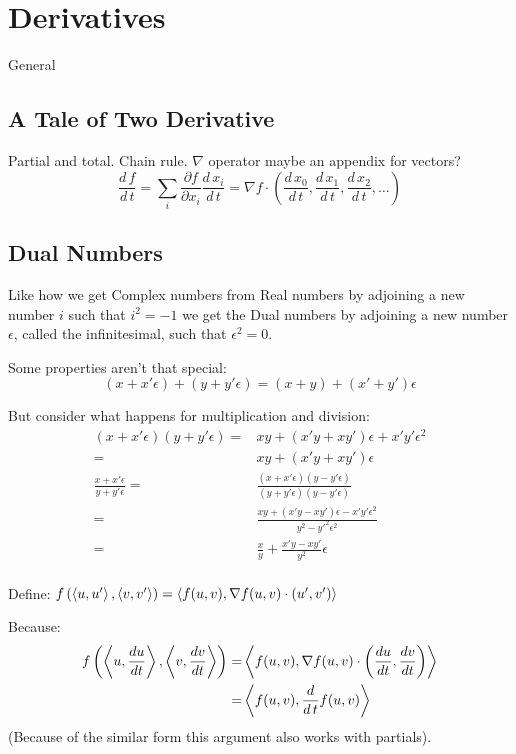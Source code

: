 
\chapter{Derivatives}
General
\section{A Tale of Two Derivative}
Partial and total.
Chain rule.
$\nabla$ operator maybe an appendix for vectors?
\[\frac{d\,f}{d\,t} = \sum_i \frac{\partial f}{\partial x_i}\frac{d\,x_i}{d\,t} = \nabla f \cdot \left(\frac{d\,x_0}{d\,t},\frac{d\,x_1}{d\,t},\frac{d\,x_2}{d\,t},\dots\right)\]
\section{Dual Numbers}
Like how we get Complex numbers from Real numbers by adjoining a new number $i$ such that $i^2=-1$ we get the Dual numbers by adjoining a new number $\epsilon$, 
called the infinitesimal, 
such that $\epsilon^2 = 0$.

Some properties aren't that special:
\[(x+x'\epsilon) + (y+y'\epsilon) = (x+y)+(x'+y')\epsilon\]

But consider what happens for multiplication and division:
\begin{equation*}
\begin{aligned}
(x+x'\epsilon)(y+y'\epsilon) =& xy+(x'y+xy')\epsilon+x'y'\epsilon^2 \\
=& xy+(x'y+xy')\epsilon \\
\frac{x+x'\epsilon}{y+y'\epsilon} =& \frac{(x+x'\epsilon)(y-y'\epsilon)}{(y+y'\epsilon)(y-y'\epsilon)} \\
 =& \frac{xy+(x'y-xy')\epsilon-x'y'\epsilon^2}{y^2-y'^2\epsilon^2} \\
 =& \frac{x}{y}+\frac{x'y-xy'}{y^2}\epsilon \\
\end{aligned}
\end{equation*}

Define:
$f\left(\left\langle u,u' \right\rangle,\left\langle v,v' \right\rangle\right) = \left\langle f(u,v),\nabla f(u,v) \cdot (u',v') \right\rangle$

Because:
\begin{equation*}
\begin{aligned}
	f\left(\left\langle u,\frac{du}{dt} \right\rangle,\left\langle v,\frac{dv}{dt} \right\rangle\right) =& \left\langle f(u,v),\nabla f(u,v) \cdot \left(\frac{du}{dt},\frac{dv}{dt}\right) \right\rangle \\
	=& \left\langle f(u,v),\frac{d}{d\,t}f(u,v) \right\rangle \\
\end{aligned}
\end{equation*}
(Because of the similar form this argument also works with partials).
